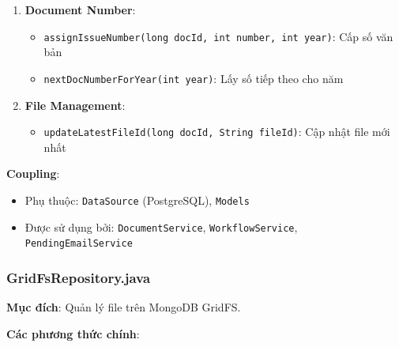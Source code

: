 \documentclass[12pt,a4paper]{article}
\begin{document}
\begin{enumerate}
    \item \textbf{Document Number}:
    \begin{itemize}
        \item \texttt{assignIssueNumber(long docId, int number, int year)}: Cấp số văn bản
        \item \texttt{nextDocNumberForYear(int year)}: Lấy số tiếp theo cho năm
    \end{itemize}
    
    \item \textbf{File Management}:
    \begin{itemize}
        \item \texttt{updateLatestFileId(long docId, String fileId)}: Cập nhật file mới nhất
    \end{itemize}
\end{enumerate}

\textbf{Coupling}:
\begin{itemize}
    \item Phụ thuộc: \texttt{DataSource} (PostgreSQL), \texttt{Models}
    \item Được sử dụng bởi: \texttt{DocumentService}, \texttt{WorkflowService}, \texttt{PendingEmailService}
\end{itemize}

\subsubsection{GridFsRepository.java}
\textbf{Mục đích}: Quản lý file trên MongoDB GridFS.

\textbf{Các phương thức chính}:
\end{document}
